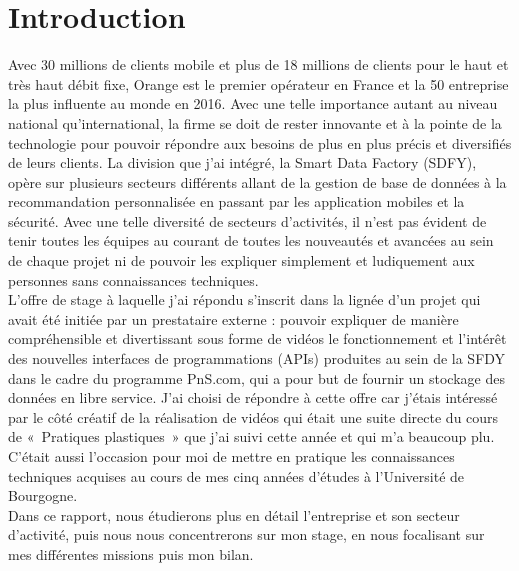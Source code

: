 \chapter*{Introduction}
\label{chap:introduction}

Avec 30 millions de clients mobile et plus de 18 millions de clients  pour le haut et très haut débit fixe, Orange est le premier opérateur en France et la 50 entreprise la plus influente au monde en 2016. Avec une telle importance autant au niveau national qu'international, la firme se doit de rester innovante et à la pointe de la technologie pour pouvoir répondre aux besoins de plus en plus précis et diversifiés de leurs clients. La division que j’ai intégré, la Smart Data Factory (SDFY), opère sur plusieurs secteurs différents allant de la gestion de base de données à la recommandation personnalisée en passant par les application mobiles et la sécurité. Avec une telle diversité de secteurs d’activités, il n’est pas évident de tenir toutes les équipes au courant de toutes les nouveautés et avancées au sein de chaque projet ni de pouvoir les expliquer simplement et ludiquement aux personnes sans connaissances techniques.\\
L’offre de stage à laquelle j’ai répondu s’inscrit dans la lignée d’un projet qui avait été initiée par un prestataire externe : pouvoir expliquer de manière compréhensible et divertissant sous forme de vidéos le fonctionnement et l’intérêt des nouvelles  interfaces de programmations (APIs) produites au sein de la SFDY dans le cadre du programme PnS.com, qui a pour but de fournir un stockage des données en libre service. J’ai choisi de répondre à cette offre car j’étais intéressé par le côté créatif de la réalisation de vidéos qui était une suite directe du cours de « Pratiques plastiques » que j’ai suivi cette année et qui m’a beaucoup plu. C’était aussi l’occasion pour moi de mettre en pratique les connaissances techniques acquises au cours de mes cinq années d'études à l’Université de Bourgogne.\\
Dans ce rapport, nous étudierons plus en détail l’entreprise et son secteur d’activité, puis nous nous concentrerons sur mon stage, en nous focalisant sur mes différentes missions puis mon bilan.
